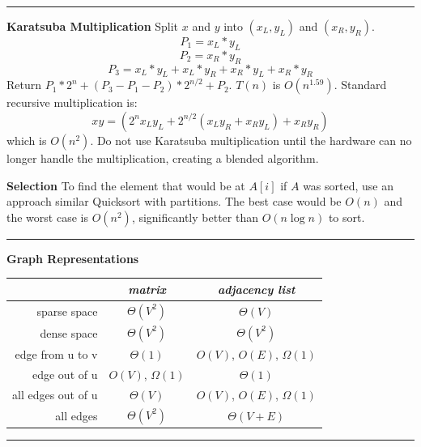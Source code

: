 \documentclass[9pt]{amsart}
\begin{document}
\begin{multicols*}{3}
  \vskip 7pt
  \hrule
  \vskip 7pt

  \textbf{Karatsuba Multiplication}
  \newline
  Split $x$ and $y$ into $(x_L, y_L)$ and $(x_R, y_R)$.
  $$P_1 = x_L * y_L$$
  $$P_2 = x_R * y_R$$
  $$P_3 = x_L * y_L + x_L * y_R + x_R * y_L + x_R * y_R$$
  Return $P_1 * 2^n + (P_3 - P_1 - P_2) * 2^{n/2} + P_2$.
  \newline
  $T(n)$ is $O(n^{1.59})$. 
  \newline
  Standard recursive multiplication is:
  $$xy = (2^{n}x_L y_L + 2^{n/2}(x_L y_R + x_R y_L) + x_R y_R)$$
  which is $O(n^2)$. Do not use Karatsuba multiplication until the hardware can
  no longer handle the multiplication, creating a blended algorithm.
  
  \textbf{Selection}
  \newline
  To find the element that would be at $A[i]$ if $A$ was sorted, use an approach similar
  Quicksort with partitions. The best case would be $O(n)$ and the worst case is $O(n^2)$, significantly
  better than $O(n \log n)$ to sort.

  \vskip 7pt
  \hrule
  \vskip 7pt

  \textbf{Graph Representations}
  \footnotesize
  \begin{center}
  \begin{tabular}{r | c | c}
     & \emph{matrix} & \emph{adjacency list} \\
     \hline
     sparse space & $\Theta(V^2)$ & $\Theta(V)$ \\
     dense space & $\Theta(V^2)$ & $\Theta(V^2)$ \\
     edge from u to v & $\Theta(1)$ & $O(V)$, $O(E)$, $\Omega(1)$ \\
     edge out of u & $O(V)$, $\Omega(1)$ & $\Theta(1)$ \\
     all edges out of u & $\Theta(V)$ & $O(V)$, $O(E)$, $\Omega(1)$ \\
     all edges & $\Theta(V^2)$ & $\Theta(V+E)$ \\
  \end{tabular}
  \end{center}
  \normalsize

  \vskip 7pt
  \hrule
  \vskip 7pt


\end{multicols*}
\end{document}
